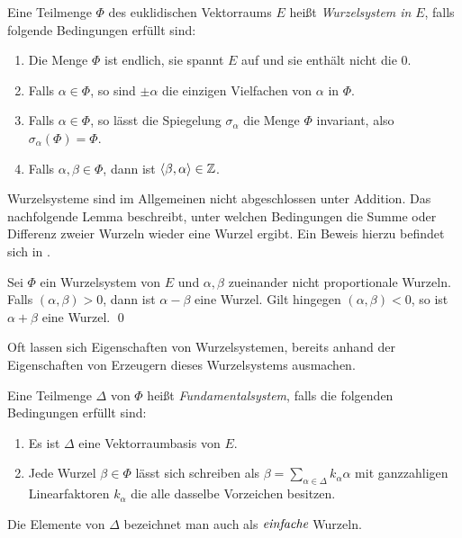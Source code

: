 \begin{defn}
  Eine Teilmenge $\Phi$ des euklidischen Vektorraums $E$ heißt \emph{Wurzelsystem in} $E$, falls folgende Bedingungen erfüllt sind:
  \begin{enumerate}[(R1)]
    \item\label{it:R1} Die Menge $\Phi$ ist endlich, sie spannt $E$ auf und sie enthält nicht die $0$.
    \item\label{it:R2} Falls $\alpha \in \Phi$, so sind $\pm \alpha$ die einzigen Vielfachen von $\alpha$ in $\Phi$.
    \item\label{it:R3} Falls $\alpha \in \Phi$, so lässt die Spiegelung $\sigma_\alpha$ die Menge $\Phi$ invariant, also $\sigma_\alpha(\Phi) = \Phi$.
    \item\label{it:R4} Falls $\alpha, \beta \in \Phi$, dann ist $\langle \beta, \alpha \rangle \in \mathbb{Z}$.
  \end{enumerate}
\end{defn}

Wurzelsysteme sind im Allgemeinen nicht abgeschlossen unter Addition. 
Das nachfolgende Lemma beschreibt, unter welchen Bedingungen die Summe oder Differenz zweier Wurzeln wieder eine Wurzel ergibt. Ein Beweis hierzu befindet sich in \cite[S.45]{humphreys1972introduction}.

\begin{lem}
  \label{lem:sumDiffRoot}
  Sei $\Phi$ ein Wurzelsystem von $E$ und $\alpha, \beta$ zueinander nicht proportionale Wurzeln.
  Falls $(\alpha, \beta) > 0$, dann ist $\alpha - \beta$ eine Wurzel.
  Gilt hingegen $(\alpha, \beta) < 0$, so ist $\alpha + \beta$ eine Wurzel. \qed
\end{lem}

Oft lassen sich Eigenschaften von Wurzelsystemen, bereits anhand der Eigenschaften von Erzeugern dieses Wurzelsystems ausmachen.

\begin{defn}
  Eine Teilmenge $\Delta$ von $\Phi$ heißt \emph{Fundamentalsystem}, falls die folgenden Bedingungen erfüllt sind:
  \begin{enumerate}[(B1)]
    \item\label{it:B1} Es ist $\Delta$ eine Vektorraumbasis von $E$.
    \item\label{it:B2} Jede Wurzel $\beta \in \Phi$ lässt sich schreiben als $\beta = \sum_{\alpha \in \Delta} k_\alpha \alpha$ mit ganzzahligen Linearfaktoren $k_\alpha$ die alle dasselbe Vorzeichen besitzen.
  \end{enumerate}
  Die Elemente von $\Delta$ bezeichnet man auch als $\emph{einfache}$ Wurzeln.
\end{defn}

